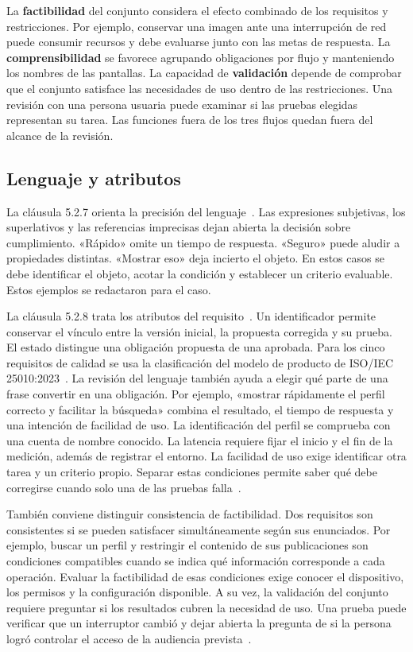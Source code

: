 \documentclass[11pt,a4paper]{article}
\begin{document}
La \textbf{factibilidad} del conjunto considera el efecto combinado de los requisitos y restricciones. Por ejemplo, conservar una imagen ante una interrupción de red puede consumir recursos y debe evaluarse junto con las metas de respuesta. La \textbf{comprensibilidad} se favorece agrupando obligaciones por flujo y manteniendo los nombres de las pantallas. La capacidad de \textbf{validación} depende de comprobar que el conjunto satisface las necesidades de uso dentro de las restricciones. Una revisión con una persona usuaria puede examinar si las pruebas elegidas representan su tarea. Las funciones fuera de los tres flujos quedan fuera del alcance de la revisión.

\subsection{Lenguaje y atributos}
La cláusula 5.2.7 orienta la precisión del lenguaje~\cite[cl. 5.2.7]{iso29148}. Las expresiones subjetivas, los superlativos y las referencias imprecisas dejan abierta la decisión sobre cumplimiento. «Rápido» omite un tiempo de respuesta. «Seguro» puede aludir a propiedades distintas. «Mostrar eso» deja incierto el objeto. En estos casos se debe identificar el objeto, acotar la condición y establecer un criterio evaluable. Estos ejemplos se redactaron para el caso.

La cláusula 5.2.8 trata los atributos del requisito~\cite[cl. 5.2.8]{iso29148}. Un identificador permite conservar el vínculo entre la versión inicial, la propuesta corregida y su prueba. El estado distingue una obligación propuesta de una aprobada. Para los cinco requisitos de calidad se usa la clasificación del modelo de producto de ISO/IEC 25010:2023~\cite{iso25010}.
La revisión del lenguaje también ayuda a elegir qué parte de una frase convertir en una obligación. Por ejemplo, «mostrar rápidamente el perfil correcto y facilitar la búsqueda» combina el resultado, el tiempo de respuesta y una intención de facilidad de uso. La identificación del perfil se comprueba con una cuenta de nombre conocido. La latencia requiere fijar el inicio y el fin de la medición, además de registrar el entorno. La facilidad de uso exige identificar otra tarea y un criterio propio. Separar estas condiciones permite saber qué debe corregirse cuando solo una de las pruebas falla~\cite[cls. 5.2.5 y 5.2.7]{iso29148}.

También conviene distinguir consistencia de factibilidad. Dos requisitos son consistentes si se pueden satisfacer simultáneamente según sus enunciados. Por ejemplo, buscar un perfil y restringir el contenido de sus publicaciones son condiciones compatibles cuando se indica qué información corresponde a cada operación. Evaluar la factibilidad de esas condiciones exige conocer el dispositivo, los permisos y la configuración disponible. A su vez, la validación del conjunto requiere preguntar si los resultados cubren la necesidad de uso. Una prueba puede verificar que un interruptor cambió y dejar abierta la pregunta de si la persona logró controlar el acceso de la audiencia prevista~\cite[cl. 5.2.6]{iso29148}.
\end{document}
